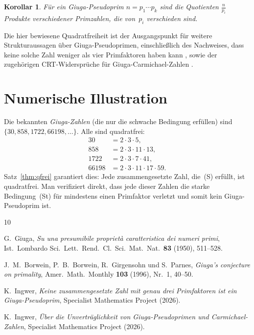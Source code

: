 \documentclass[12pt,a4paper]{amsart}
\newtheorem{corollary}[theorem]{Korollar}
\theoremstyle{definition}
\begin{document}
\begin{corollary}
Für ein Giuga-Pseudoprim $n = p_1 \cdots p_k$ sind die Quotienten
$\tfrac{n}{p_i}$ Produkte verschiedener Primzahlen, die von~$p_i$ verschieden sind.
\end{corollary}

Die hier bewiesene Quadratfreiheit ist der Ausgangspunkt für weitere Strukturaussagen
über Giuga-Pseudoprimen, einschließlich des Nachweises, dass keine solche Zahl weniger
als vier Primfaktoren haben kann \cite{Ingwer2026a}, sowie der zugehörigen
CRT-Widersprüche für Giuga-Carmichael-Zahlen \cite{Ingwer2026c}.

\section{Numerische Illustration}

Die bekannten \emph{Giuga-Zahlen} (die nur die schwache Bedingung erfüllen) sind
$\{30, 858, 1722, 66198, \ldots\}$. Alle sind quadratfrei:
\begin{align*}
  30 &= 2 \cdot 3 \cdot 5, \\
  858 &= 2 \cdot 3 \cdot 11 \cdot 13, \\
  1722 &= 2 \cdot 3 \cdot 7 \cdot 41, \\
  66198 &= 2 \cdot 3 \cdot 11 \cdot 17 \cdot 59.
\end{align*}
Satz~\ref{thm:qfrei} garantiert dies: Jede zusammengesetzte Zahl, die~(S) erfüllt,
ist quadratfrei. Man verifiziert direkt, dass jede dieser Zahlen die starke
Bedingung~(St) für mindestens einen Primfaktor verletzt und somit kein
Giuga-Pseudoprim ist.

\begin{thebibliography}{10}

G.~Giuga,
\emph{Su una presumibile propriet\`a caratteristica dei numeri primi},
Ist.\ Lombardo Sci.\ Lett.\ Rend.\ Cl.\ Sci.\ Mat.\ Nat.\ \textbf{83}
(1950), 511--528.

J.~M.~Borwein, P.~B.~Borwein, R.~Girgensohn und S.~Parnes,
\emph{Giuga's conjecture on primality},
Amer.\ Math.\ Monthly \textbf{103} (1996), Nr.\ 1, 40--50.

K.~Ingwer,
\emph{Keine zusammengesetzte Zahl mit genau drei Primfaktoren ist ein Giuga-Pseudoprim},
Specialist Mathematics Project (2026).

K.~Ingwer,
\emph{Über die Unverträglichkeit von Giuga-Pseudoprimen und Carmichael-Zahlen},
Specialist Mathematics Project (2026).

\end{thebibliography}
\end{document}
